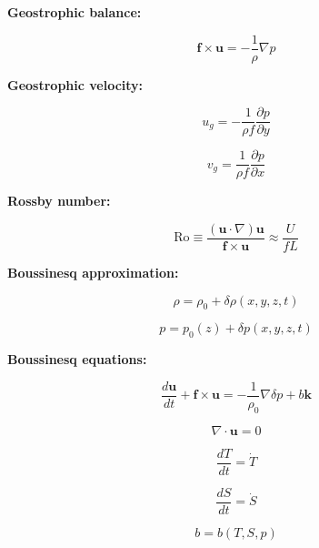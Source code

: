 \documentclass[12pt]{article}
\numberwithin{equation}{section}
\numberwithin{figure}{section}
\numberwithin{table}{section}
\begin{document}
\textbf{Geostrophic balance:}

\begin{equation}
  \mathbf{f} \times \mathbf{u} = - \frac{1}{\rho} \nabla p
\end{equation}

\textbf{Geostrophic velocity:}

\begin{equation}
  u_g = - \frac{1}{\rho f} \frac{\partial p}{\partial y}
\end{equation}

\begin{equation}
  v_g = \frac{1}{\rho f} \frac{\partial p}{\partial x}
\end{equation}

\textbf{Rossby number:}

\begin{equation}
  \text{Ro} \equiv \frac{\left( \mathbf{u} \cdot \nabla \right) \mathbf{u}}{\mathbf{f} \times \mathbf{u}} \approx \frac{U}{fL}
\end{equation}

\textbf{Boussinesq approximation:}

\begin{equation}
  \rho = \rho_0 + \delta \rho(x, y, z, t)
\end{equation}

\begin{equation}
  p = p_0(z) + \delta p(x, y, z, t)
\end{equation}

\textbf{Boussinesq equations:}

\begin{equation}
  \frac{d \mathbf{u}}{dt} + \mathbf{f} \times \mathbf{u} =
  - \frac{1}{\rho_0} \nabla \delta p + b \mathbf{k}
\end{equation}

\begin{equation}
  \nabla \cdot \mathbf{u} = 0
\end{equation}

\begin{equation}
  \frac{d T}{dt} = \dot{T}
\end{equation}

\begin{equation}
  \frac{d S}{dt} = \dot{S}
\end{equation}

\begin{equation}
  b = b(T, S, p)
\end{equation}
\end{document}
